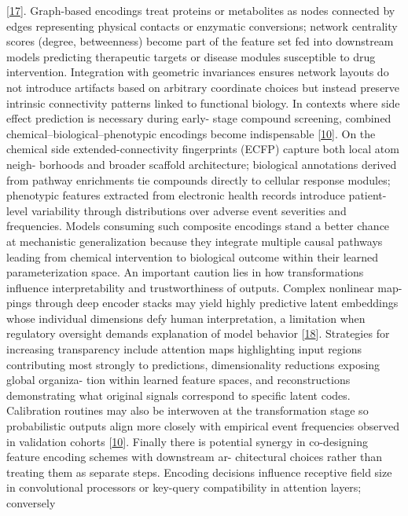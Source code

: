 \documentclass[
]{article}
\begin{document}
{[}\protect\hyperlink{_bookmark57}{17}{]}. Graph-based encodings treat
proteins or metabolites as nodes connected by edges representing
physical contacts or enzymatic conversions; network centrality scores
(degree, betweenness) become part of the feature set fed into downstream
models predicting therapeutic targets or disease modules susceptible to
drug intervention. Integration with geometric invariances ensures
network layouts do not introduce artifacts based on arbitrary coordinate
choices but instead preserve intrinsic connectivity patterns linked to
functional biology. In contexts where side effect prediction is
necessary during early- stage compound screening, combined
chemical--biological--phenotypic encodings become indispensable
{[}\protect\hyperlink{_bookmark50}{10}{]}. On the chemical side
extended-connectivity fingerprints (ECFP) capture both local atom neigh-
borhoods and broader scaffold architecture; biological annotations
derived from pathway enrichments tie compounds directly to cellular
response modules; phenotypic features extracted from electronic health
records introduce patient-level variability through distributions over
adverse event severities and frequencies. Models consuming such
composite encodings stand a better chance at mechanistic generalization
because they integrate multiple causal pathways leading from chemical
intervention to biological outcome within their learned parameterization
space. An important caution lies in how transformations influence
interpretability and trustworthiness of outputs. Complex nonlinear map-
pings through deep encoder stacks may yield highly predictive latent
embeddings whose individual dimensions defy human interpretation, a
limitation when regulatory oversight demands explanation of model
behavior {[}\protect\hyperlink{_bookmark58}{18}{]}. Strategies for
increasing transparency include attention maps highlighting input
regions contributing most strongly to predictions, dimensionality
reductions exposing global organiza- tion within learned feature spaces,
and reconstructions demonstrating what original signals correspond to
specific latent codes. Calibration routines may also be interwoven at
the transformation stage so probabilistic outputs align more closely
with empirical event frequencies observed in validation cohorts
{[}\protect\hyperlink{_bookmark50}{10}{]}. Finally there is potential
synergy in co-designing feature encoding schemes with downstream ar-
chitectural choices rather than treating them as separate steps.
Encoding decisions influence receptive field size in convolutional
processors or key-query compatibility in attention layers; conversely
\end{document}

